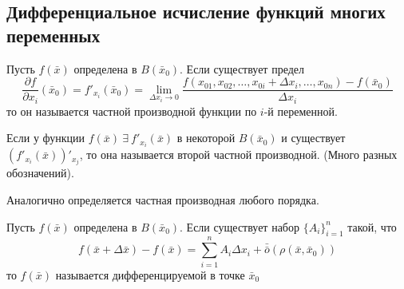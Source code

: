 \subsection{Дифференциальное исчисление функций многих переменных}
\begin{definition}
    Пусть $f(\bar{x})$ определена в $B(\bar{x}_0)$. Если существует предел
    \[\frac{\partial {f}}{\partial {x_i}}(\bar{x}_0)=f'_{x_i}(\bar{x}_0)=\lim\limits_{\Delta x_i\to 0}\frac{f(x_{01}, x_{02}, \dots, x_{0i}+\Delta x_i, \dots, x_{0n})-f(\bar{x}_0)}{\Delta x_i}\]
    то он называется частной производной функции по $i$-й переменной.
\end{definition} 
\begin{definition}
    Если у функции $f(\bar{x})\ \exists\ f'_{x_i}(\bar{x})$ в некоторой $B(\bar{x}_0)$ и существует $(f'_{x_i}(\bar{x}))'_{x_j}$, то она называется второй частной производной.
    (Много разных обозначений).
\end{definition} 
\begin{comm}
    Аналогично определяется частная производная любого порядка.
\end{comm}
\begin{definition}
    Пусть $f(\bar{x})$ определена в $B(\bar{x}_0)$. Если существует набор $\{A_i\}_{i=1}^n$ такой, что
    \[f(\bar{x}+\Delta \bar{x})-f(\bar{x})=\sum\limits_{i=1}^{n}A_i \Delta x_i +\bar{\bar{o}}{(\rho(\bar{x}, \bar{x}_0))}\]
    то $f(\bar{x})$ называется дифференцируемой в точке $\bar{x}_0$
\end{definition} 
